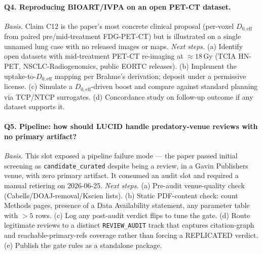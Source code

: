 \paragraph{Q4. Reproducing BIOART/IVPA on an open PET-CT dataset.}
\emph{Basis.} Claim C12 is the paper's most concrete clinical proposal
(per-voxel $D_{0,\text{eff}}$ from paired pre/mid-treatment FDG-PET-CT)
but is illustrated on a single unnamed lung case with no released
images or maps.
\emph{Next steps.} (a) Identify open datasets with mid-treatment PET-CT
re-imaging at $\approx 18$\,Gy (TCIA HN-PET, NSCLC-Radiogenomics,
public EORTC releases). (b) Implement the uptake-to-$D_{0,\text{eff}}$
mapping per Brahme's derivation; deposit under a permissive license.
(c) Simulate a $D_{0,\text{eff}}$-driven boost and compare against
standard planning via TCP/NTCP surrogates. (d) Concordance study on
follow-up outcome if any dataset supports it.

\paragraph{Q5. Pipeline: how should LUCID handle predatory-venue reviews with no primary artifact?}
\emph{Basis.} This slot exposed a pipeline failure mode --- the paper
passed initial screening as \texttt{candidate\_curated} despite being
a review, in a Gavin Publishers venue, with zero primary artifact. It
consumed an audit slot and required a manual retiering on 2026-06-25.
\emph{Next steps.} (a) Pre-audit venue-quality check
(Cabells/DOAJ-removal/Kscien lists). (b) Static PDF-content check:
count Methods pages, presence of a Data Availability statement, any
parameter table with $>5$ rows. (c) Log any post-audit verdict flips to
tune the gate. (d) Route legitimate reviews to a distinct
\texttt{REVIEW\_AUDIT} track that captures citation-graph and
reachable-primary-refs coverage rather than forcing a REPLICATED
verdict. (e) Publish the gate rules as a standalone package.

